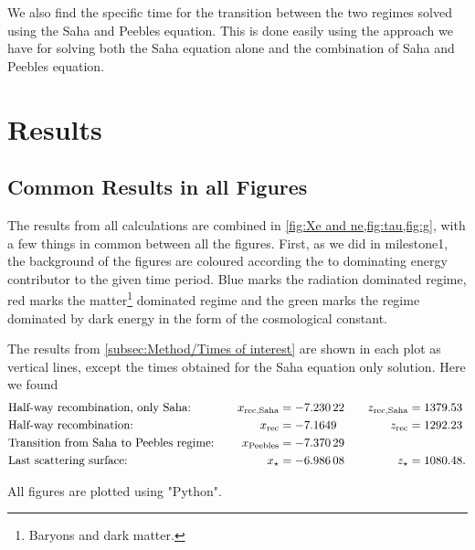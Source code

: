 \documentclass[10pt,a4paper]{article}
\begin{document}
We also find the specific time for the transition between the two regimes solved using the Saha and Peebles equation. This is done easily using the approach we have for solving both the Saha equation alone and the combination of Saha and Peebles equation.

\section{Results}
\label{sec:Results}
\subsection{Common Results in all Figures}
\label{subsec:Results/Common in figs}
The results from all calculations are combined in \cref{fig:Xe and ne,fig:tau,fig:g}, with a few things in common between all the figures. First, as we did in milestone1\citep{milestone1}, the background of the figures are coloured according the to dominating energy contributor to the given time period. Blue marks the radiation dominated regime, red marks the matter\footnote{Baryons and dark matter.} dominated regime and the green marks the regime dominated by dark energy in the form of the cosmological constant.

The results from \cref{subsec:Method/Times of interest} are shown in each plot as vertical lines, except the times obtained for the Saha equation only solution. Here we found
\begin{alignat*}{3}
    & \text{Half-way recombination, only Saha:}      &\quad x_{\rm{rec,Saha}} &= \num{-7.23022} &\quad z_{\rm{rec,Saha}} &= \num{1379.53}
    \\
    & \text{Half-way recombination:}                 &\quad x_{\rm{rec}}      &= \num{-7.1649}  &\quad z_{\rm{rec}}      &= \num{1292.23} 
    \\
    & \text{Transition from Saha to Peebles regime:} &\quad x_{\rm{Peebles}}  &= \num{-7.37029} &\quad                   &
    \\
    & \text{Last scattering surface:}                &\quad x_{\star}         &= \num{-6.98608} &\quad z_{\star}         &= \num{1080.48}.
\end{alignat*}%

All figures are plotted using "Python".
\end{document}
